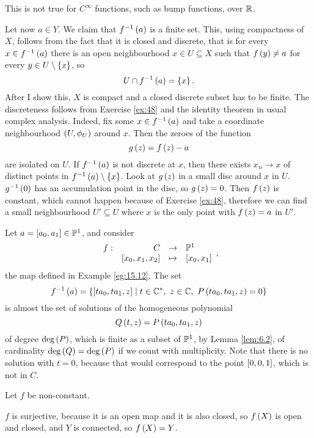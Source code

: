 \begin{remark*}
This is not true for $ C^\infty $ functions, such as bump functions, over $ \R $.
\end{remark*}

\pagebreak

Let now $ a \in Y $. We claim that $ f^{-1}\rb{a} $ is a finite set. This, using compactness of $ X $, follows from the fact that it is closed and discrete, that is for every $ x \in f^{-1}\rb{a} $ there is an open neighbourhood $ x \in U \subseteq X $ such that $ f\rb{y} \ne a $ for every $ y \in U \setminus \cb{x} $, so
$$ U \cap f^{-1}\rb{a} = \cb{x}. $$
After I show this, $ X $ is compact and a closed discrete subset has to be finite. The discreteness follows from Exercise \ref{ex:48} and the identity theorem in usual complex analysis. Indeed, fix some $ x \in f^{-1}\rb{a} $ and take a coordinate neighbourhood $ \rb{U, \phi_U} $ around $ x $. Then the zeroes of the function
$$ g\rb{z} = f\rb{z} - a $$
are isolated on $ U $. If $ f^{-1}\rb{a} $ is not discrete at $ x $, then there exists $ x_n \to x $ of distinct points in $ f^{-1}\rb{a} \setminus \cb{x} $. Look at $ g\rb{z} $ in a small disc around $ x $ in $ U $. $ g^{-1}\rb{0} $ has an accumulation point in the disc, so $ g\rb{z} = 0 $. Then $ f\rb{z} $ is constant, which cannot happen because of Exercise \ref{ex:48}, therefore we can find a small neighbourhood $ U' \subseteq U $ where $ x $ is the only point with $ f\rb{z} = a $ in $ U' $.

\begin{example}
Let $ a = \sb{a_0, a_1} \in \P^1 $, and consider
$$ \function[f]{C}{\P^1}{\sb{x_0, x_1, x_2}}{\sb{x_0, x_1}}, $$
the map defined in Example \ref{eg:15.12}. The set
$$ f^{-1}\rb{a} = \cb{\sb{ta_0, ta_1, z} \mid t \in \C^*, \ z \in \C, \ P\rb{ta_0, ta_1, z} = 0} $$
is almost the set of solutions of the homogeneous polynomial
$$ Q\rb{t, z} = P\rb{ta_0, ta_1, z} $$
of degree $ \deg\rb{P} $, which is finite as a subset of $ \P^1 $, by Lemma \ref{lem:6.2}, of cardinality $ \deg\rb{Q} = \deg\rb{P} $ if we count with multiplicity. Note that there is no solution with $ t = 0 $, because that would correspond to the point $ \sb{0, 0, 1} $, which is not in $ C $.
\end{example}

Let $ f $ be non-constant.

\begin{remark*}
$ f $ is surjective, because it is an open map and it is also closed, so $ f\rb{X} $ is open and closed, and $ Y $ is connected, so $ f\rb{X} = Y $.
\end{remark*}

